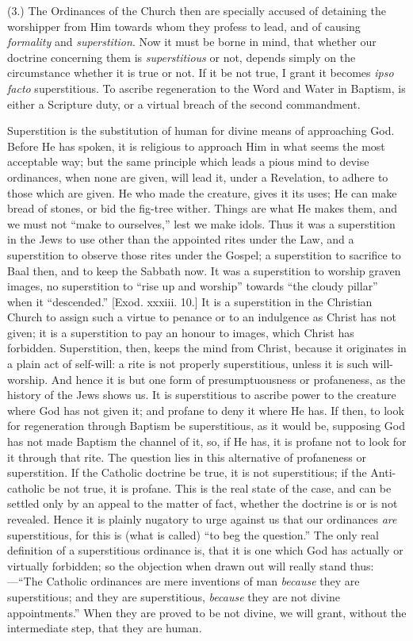 (3.) The Ordinances of the Church then are specially accused of
detaining the worshipper from Him towards whom they profess to lead,
and of causing \emph{formality} and \emph{superstition}. Now it must
be borne in mind, that whether our doctrine concerning them is \emph{superstitious}
or not, depends simply on the circumstance whether it is true or not.
If it be not true, I grant it becomes \emph{ipso facto} superstitious.
To ascribe regeneration to the Word and Water in Baptism, is either a
Scripture duty, or a virtual breach of the second commandment.

Superstition is the substitution of human for divine means of
approaching God. Before He has spoken, it is religious to approach Him
in what seems the most acceptable way; but the same principle which
leads a pious mind to devise ordinances, when none are given, will
lead it, under a Revelation, to adhere to those which are given. He
who made the creature, gives it its uses; He can make bread of
stones, or bid the fig-tree wither. Things are what He makes them, and
we must not ``make to ourselves,'' lest we make idols. Thus it
was a superstition in the Jews to use other than the appointed rites
under the Law, and a superstition to observe those rites under the
Gospel; a superstition to sacrifice to Baal then, and to keep the
Sabbath now. It was a superstition to worship graven images, no
superstition to ``rise up and worship'' towards ``the
cloudy pillar'' when it ``descended.'' [Exod. xxxiii. 10.]
It is a superstition in the Christian Church to assign such a virtue
to penance or to an indulgence as Christ has not given; it is a
superstition to pay an honour to images, which Christ has forbidden.
Superstition, then, keeps the mind from Christ, because it originates
in a plain act of self-will: a rite is not properly superstitious,
unless it is such will-worship. And hence it is but one form of
presumptuousness or profaneness, as the history of the Jews shows us.
It is superstitious to ascribe power to the creature where God has not
given it; and profane to deny it where He has. If then, to look for
regeneration through Baptism be superstitious, as it would be,
supposing God has not made Baptism the channel of it, so, if He has,
it is profane not to look for it through that rite. The question lies
in this alternative of profaneness or superstition. If the Catholic
doctrine be true, it is not superstitious; if the Anti-catholic be not
true, it is profane. This is the real state of the case, and can be
settled only by an appeal to the matter of fact, whether the doctrine
is or is not revealed. Hence it is plainly nugatory to urge against us
that our ordinances \emph{are} superstitious, for this is (what
is called) ``to beg the question.'' The only real definition
of a superstitious ordinance is, that it is one which God has actually
or virtually forbidden; so the objection when drawn out will really
stand thus:—``The Catholic ordinances are mere inventions of man
\emph{because} they are superstitious; and they are superstitious, \emph{because}
they are not divine appointments.'' When they are proved to be not
divine, we will grant, without the intermediate step, that they are
human.

